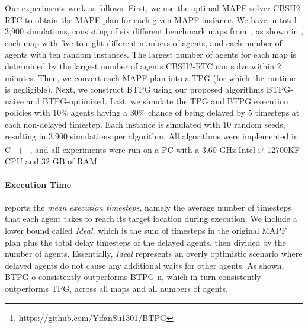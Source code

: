 \documentclass[letterpaper]{article} %
\theoremstyle{definition}
\begin{document}
Our experiments work as follows. First, we use the optimal MAPF solver CBSH2-RTC \cite{li_pairwise_2021} to obtain the MAPF plan for each given MAPF instance. We have in total 3,900 simulations, consisting of six different benchmark maps from~\cite{stern_multi-agent_2021}, as shown in , each map with five to eight different numbers of agents, and each number of agents with ten random instances. The largest number of agents for each map is determined by the largest number of agents CBSH2-RTC can solve within 2 minutes. 
Then, we convert each MAPF plan into a TPG (for which the runtime is negligible). 
Next, we construct BTPG using our proposed algorithms BTPG-naive and BTPG-optimized. Last, we simulate the TPG and BTPG execution policies with 10\% agents having a 30\% chance of being delayed by 5 timesteps at each non-delayed timestep. Each instance is simulated with 10 random seeds, resulting in 3,900 simulations per algorithm.
All algorithms were implemented in C++ \footnote{https://github.com/YifanSu1301/BTPG}, and all experiments were run on a PC with a 3.60 GHz Intel i7-12700KF CPU and 32 GB of RAM. 
 

\paragraph{Execution Time}  reports the \emph{mean execution timesteps}, namely the average number of timesteps that each agent takes to reach its target location during execution. We include a lower bound called \emph{Ideal}, which is the sum of timesteps in the original MAPF plan plus the total delay timesteps of the delayed agents, then divided by the number of agents. Essentially, \emph{Ideal} represents an overly optimistic scenario where delayed agents do not cause any additional waits for other agents. As shown, BTPG-o consistently outperforms BTPG-n, which in turn consistently outperforms TPG, across all maps and all numbers of agents. 
\end{document}
